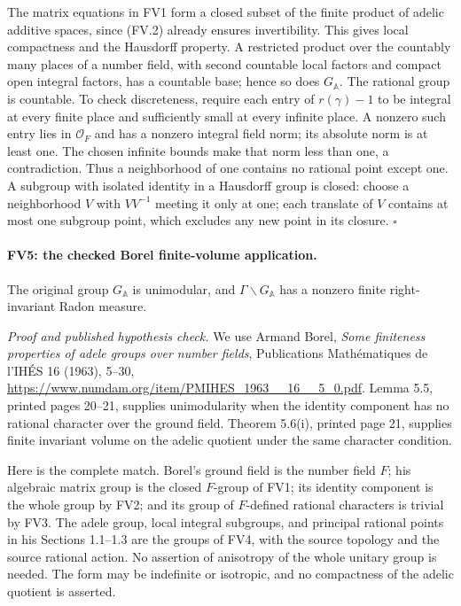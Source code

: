 The matrix equations in FV1 form a closed subset of the finite
product of adelic additive spaces, since (FV.2) already ensures
invertibility.  This gives local compactness and the Hausdorff
property.  A restricted product over the countably many places of
a number field, with second countable local factors and compact
open integral factors, has a countable base; hence so does \(G_{\mathbb A}\).
The rational group is countable.  To check discreteness, require
each entry of \(r(\gamma)-1\) to be integral at every finite place
and sufficiently small at every infinite place.  A nonzero such
entry lies in \(\mathcal O_F\) and has a nonzero integral field norm;
its absolute norm is at least one.  The chosen infinite bounds make
that norm less than one, a contradiction.  Thus a neighborhood
of one contains no rational point except one.  A subgroup with
isolated identity in a Hausdorff group is closed: choose a
neighborhood \(V\) with \(VV^{-1}\) meeting it only at one; each
translate of \(V\) contains at most one subgroup point, which excludes
any new point in its closure. \(\square\)

\paragraph{FV5: the checked Borel finite-volume application.}
\label{claim:FV5}
The original group \(G_{\mathbb A}\) is unimodular, and
\(\Gamma\backslash G_{\mathbb A}\) has a nonzero finite
right-invariant Radon measure.

\emph{Proof and published hypothesis check.}
We use Armand Borel, \emph{Some finiteness properties of adele groups
over number fields}, Publications Math\'ematiques de l'IH\'ES
16 (1963), 5--30,
\url{https://www.numdam.org/item/PMIHES_1963__16__5_0.pdf}.
Lemma 5.5, printed pages 20--21, supplies unimodularity when the
identity component has no rational character over the ground field.
Theorem 5.6(i), printed page 21, supplies finite invariant volume on
the adelic quotient under the same character condition.

Here is the complete match.  Borel's ground field is the number field
\(F\); his algebraic matrix group is the closed \(F\)-group of FV1;
its identity component is the whole group by FV2; and its group of
\(F\)-defined rational characters is trivial by FV3.  The adele
group, local integral subgroups, and principal rational points in
his Sections 1.1--1.3 are the groups of FV4, with the source
topology and the source rational action.  No assertion of
anisotropy of the whole unitary group is needed.  The form may be
indefinite or isotropic, and no compactness of the adelic quotient
is asserted.

